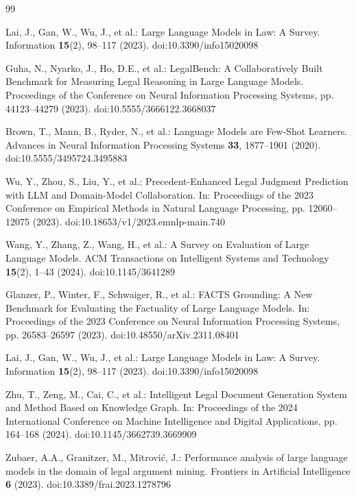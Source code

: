 \documentclass{article}
\theoremstyle{plain}
\theoremstyle{definition}
\begin{document}
\begin{thebibliography}{99}

Lai, J., Gan, W., Wu, J., et al.: Large Language Models in Law: A Survey. Information \textbf{15}(2), 98--117 (2023). doi:10.3390/info15020098

Guha, N., Nyarko, J., Ho, D.E., et al.: LegalBench: A Collaboratively Built Benchmark for Measuring Legal Reasoning in Large Language Models. Proceedings of the Conference on Neural Information Processing Systems, pp. 44123--44279 (2023). doi:10.5555/3666122.3668037

Brown, T., Mann, B., Ryder, N., et al.: Language Models are Few-Shot Learners. Advances in Neural Information Processing Systems \textbf{33}, 1877--1901 (2020). doi:10.5555/3495724.3495883

Wu, Y., Zhou, S., Liu, Y., et al.: Precedent-Enhanced Legal Judgment Prediction with LLM and Domain-Model Collaboration. In: Proceedings of the 2023 Conference on Empirical Methods in Natural Language Processing, pp. 12060--12075 (2023). doi:10.18653/v1/2023.emnlp-main.740

Wang, Y., Zhang, Z., Wang, H., et al.: A Survey on Evaluation of Large Language Models. ACM Transactions on Intelligent Systems and Technology \textbf{15}(2), 1--43 (2024). doi:10.1145/3641289

Glanzer, P., Winter, F., Schwaiger, R., et al.: FACTS Grounding: A New Benchmark for Evaluating the Factuality of Large Language Models. In: Proceedings of the 2023 Conference on Neural Information Processing Systems, pp. 26583--26597 (2023). doi:10.48550/arXiv.2311.08401

Lai, J., Gan, W., Wu, J., et al.: Large Language Models in Law: A Survey. Information \textbf{15}(2), 98--117 (2023). doi:10.3390/info15020098

Zhu, T., Zeng, M., Cai, C., et al.: Intelligent Legal Document Generation System and Method Based on Knowledge Graph. In: Proceedings of the 2024 International Conference on Machine Intelligence and Digital Applications, pp. 164--168 (2024). doi:10.1145/3662739.3669909

Zubaer, A.A., Granitzer, M., Mitrović, J.: Performance analysis of large language models in the domain of legal argument mining. Frontiers in Artificial Intelligence \textbf{6} (2023). doi:10.3389/frai.2023.1278796


\end{thebibliography}
\end{document}
